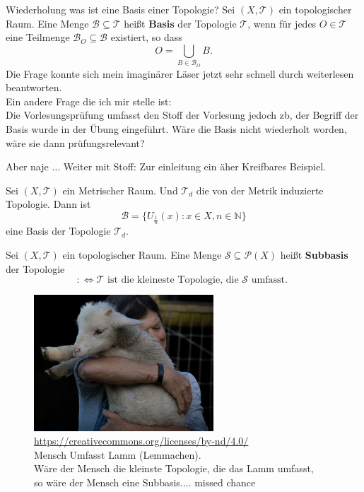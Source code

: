 \chapter{}
Wiederholung was ist eine Basis einer Topologie?
{
    Sei $(X, \mathcal{T})$ ein topologischer Raum. Eine Menge 
    $\mathcal{B} \subseteq \mathcal{T}$ heißt \textbf{Basis} der Topologie 
    $\mathcal{T}$, wenn für jedes $O \in \mathcal{T}$ eine Teilmenge 
    $\mathcal{B}_O \subseteq \mathcal{B}$ existiert, so dass
    $$
        O = \bigcup_{B \in \mathcal{B}_O} B .
    $$
}
Die Frage konnte sich mein imaginärer Läser jetzt sehr schnell durch 
weiterlesen beantworten.\\
Ein andere Frage die ich mir stelle ist:\\
Die Vorlesungsprüfung umfasst den Stoff der Vorlesung jedoch zb, 
der Begriff der Basis wurde in der Übung eingeführt.
Wäre die Basis nicht wiederholt worden, wäre sie dann prüfungsrelevant?



Aber naje $\dots$ Weiter mit Stoff:
Zur einleitung ein äher Kreifbares Beispiel.

\ex{}
{Sei $(X, \mathcal{T})$ ein Metrischer Raum.
Und $\mathcal{T}_d$ die von der Metrik induzierte Topologie.
Dann ist $$
\mathcal{B} = \{ U_{\frac{1}{n}}(x) : x \in X, n \in \mathbb{N} \}
$$
eine Basis der Topologie $\mathcal{T}_d$.
}

{
    Sei $(X, \mathcal{T})$ ein topologischer Raum. Eine Menge 
    $\mathcal{S} \subseteq \mathcal{P}(X)$ heißt \textbf{Subbasis} 
    der Topologie 
    $$
    : \Leftrightarrow \mathcal{T}
    \text{ ist die kleineste Topologie,
     die } \mathcal{S} \text{ umfasst. }
    $$
}

\begin{figure}[h!]
 \centering
    \includegraphics[width=0.6\textwidth]{pictures/hug_lemma.png}
    \caption{\url{https://creativecommons.org/licenses/by-nd/4.0/}\\
    Mensch Umfasst Lamm (Lemmachen).\\
    Wäre der Mensch die kleinste Topologie, 
    die das Lamm umfasst,\\
    so wäre der Mensch eine Subbasis.$\dots$ missed chance}
 \end{figure}


